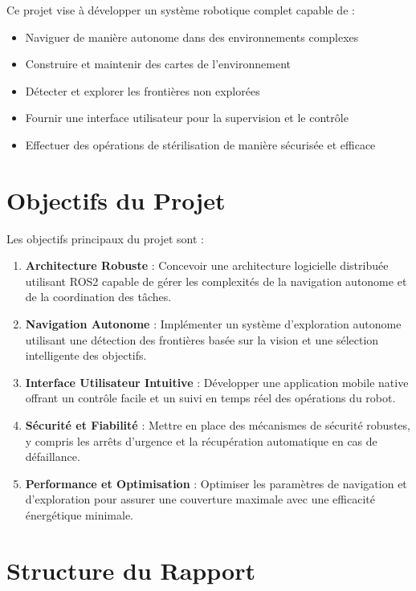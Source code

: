 \documentclass[12pt,a4paper,oneside]{report}
\begin{document}
Ce projet vise à développer un système robotique complet capable de :
\begin{itemize}
  \item Naviguer de manière autonome dans des environnements complexes
  \item Construire et maintenir des cartes de l'environnement
  \item Détecter et explorer les frontières non explorées
  \item Fournir une interface utilisateur pour la supervision et le contrôle
  \item Effectuer des opérations de stérilisation de manière sécurisée et efficace
\end{itemize}

\section{Objectifs du Projet}

Les objectifs principaux du projet sont :

\begin{enumerate}
  \item \textbf{Architecture Robuste} : Concevoir une architecture logicielle distribuée utilisant ROS2 capable de gérer les complexités de la navigation autonome et de la coordination des tâches.
  
  \item \textbf{Navigation Autonome} : Implémenter un système d'exploration autonome utilisant une détection des frontières basée sur la vision et une sélection intelligente des objectifs.
  
  \item \textbf{Interface Utilisateur Intuitive} : Développer une application mobile native offrant un contrôle facile et un suivi en temps réel des opérations du robot.
  
  \item \textbf{Sécurité et Fiabilité} : Mettre en place des mécanismes de sécurité robustes, y compris les arrêts d'urgence et la récupération automatique en cas de défaillance.
  
  \item \textbf{Performance et Optimisation} : Optimiser les paramètres de navigation et d'exploration pour assurer une couverture maximale avec une efficacité énergétique minimale.
\end{enumerate}

\section{Structure du Rapport}
\end{document}
